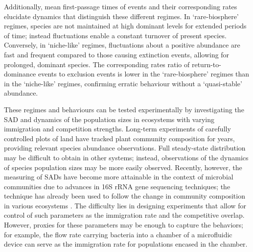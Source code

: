 \documentclass[9pt,twocolumn,twoside,lineno]{pnas-new}
\begin{document}
Additionally, mean first-passage times of events and their corresponding rates elucidate dynamics that distinguish these different regimes.
In `rare-biosphere' regimes, species are not maintained at high dominant levels for extended periods of time; instead fluctuations enable a constant turnover of present species.
Conversely, in `niche-like' regimes, fluctuations about a positive abundance are fast and frequent compared to those causing extinction events, allowing for prolonged, dominant species.
The corresponding rates ratio of return-to-dominance events to exclusion events is lower in the `rare-biosphere' regimes than in the `niche-like' regimes, confirming erratic behaviour without a `quasi-stable' abundance.

These regimes and behaviours can be tested experimentally by investigating the SAD and dynamics of the population sizes in ecosystems with varying immigration and competition strengths.
Long-term experiments of carefully controlled plots of land have tracked plant community composition for years, providing relevant species abundance observations.
Full steady-state distribution may be difficult to obtain in other systems; instead, observations of the dynamics of species population sizes may be more easily observed.
Recently, however, the measuring of SADs have become more attainable in the context of microbial communities due to advances in 16S rRNA gene sequencing techniques; the technique has already been used to follow the change in community composition in various ecosystems \cite{ratzke2020strength}.
The difficulty lies in designing experiments that allow for control of such parameters as the immigration rate and the competitive overlap.
However, proxies for these parameters may be enough to capture the behaviors; for example, the flow rate carrying bacteria into a chamber of a microfluidic device can serve as the immigration rate for populations encased in the chamber.
\end{document}

